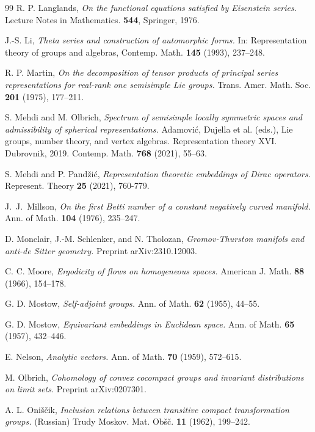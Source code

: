 \documentclass[10]{amsart}
\theoremstyle{remark}
\theoremstyle{definition}
\numberwithin{equation}{section}
\begin{document}
{\begin{thebibliography}{99}
 R. P. Langlands, {\it On the functional equations satisfied by Eisenstein series.} 
Lecture Notes in Mathematics. {\bf 544}, Springer, 1976. 

J.-S. Li, {\it Theta series and construction of automorphic forms.} In: Representation theory of groups and algebras, Contemp. Math. {\bf 145} (1993), 237--248. 

R. P. Martin, {\it On the decomposition of tensor products of principal series representations for real-rank one semisimple Lie groups.}  Trans. Amer. Math. Soc. {\bf 201}  (1975),  177--211. 

 S. Mehdi and M. Olbrich, {\em Spectrum of semisimple locally symmetric spaces and admissibility of spherical representations.} 
Adamovi\'c, Dujella et al. (eds.), Lie groups, number theory, and vertex algebras. Representation theory XVI. Dubrovnik, 2019. %
Contemp. Math. {\bf 768} (2021), 55--63.

 S. Mehdi and P. Pand\v zi\'c, {\it Representation theoretic embeddings of Dirac operators.} Represent. Theory {\bf 25} (2021), 760-779. 

 J.~J.~Millson, {\it On the first Betti number of a constant negatively curved manifold.}  
Ann. of Math. {\bf 104} (1976), 235--247.

 D. Monclair, J.-M. Schlenker, and N. Tholozan, {\em Gromov-Thurston manifols and anti-de Sitter geometry.} Preprint arXiv:2310.12003.

 C. C. Moore, {\it Ergodicity of flows on homogeneous spaces.} American J. Math. {\bf 88} (1966), 154--178. 

 G. D. Mostow, {\it Self-adjoint groups.}  
Ann. of Math. {\bf 62} (1955), 44--55.

 G. D. Mostow, {\it Equivariant embeddings in Euclidean space.}  
Ann. of Math. {\bf 65} (1957), 432--446.

 E. Nelson, {\it Analytic vectors.}  
Ann. of Math. {\bf 70} (1959), 572--615.

 M. Olbrich, {\it Cohomology of convex cocompact groups and invariant distributions on limit sets.} Preprint arXiv:0207301.

  A. L. Oni\v s\v cik, {\it Inclusion relations between transitive compact transformation
 groups.} (Russian)   Trudy  Moskov. Mat. Ob\v s\v c.  {\bf 11} (1962), 199--242.


\end{thebibliography}}
\end{document}
